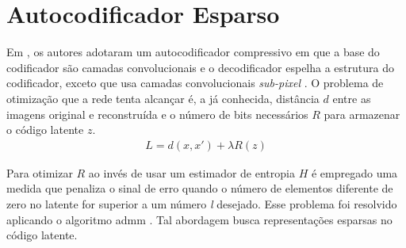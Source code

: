 \section{Autocodificador Esparso}

Em \cite{zhao1901cae}, os autores adotaram um autocodificador compressivo em que a base do codificador são camadas convolucionais e o decodificador espelha a estrutura do codificador, exceto que usa  camadas convolucionais \textit{sub-pixel} \cite{li2018learning}. O problema de otimização que a rede tenta alcançar é, a já conhecida, distância $d$ entre as imagens original e reconstruída e o número de bits necessários $R$ para armazenar o código latente $z$.
\begin{equation}
\begin{aligned}
L = d(x,x') + \lambda R(z) 
\end{aligned}
\end{equation}

Para otimizar $R$ ao invés de usar um estimador de entropia $H$ é empregado uma medida que penaliza o sinal de erro quando o número de elementos diferente de zero no latente for superior a um número \textit{l} desejado. Esse problema foi resolvido aplicando o algoritmo \acrshort{admm} \cite{ye2018progressive}. Tal abordagem busca representações esparsas no código latente. 



